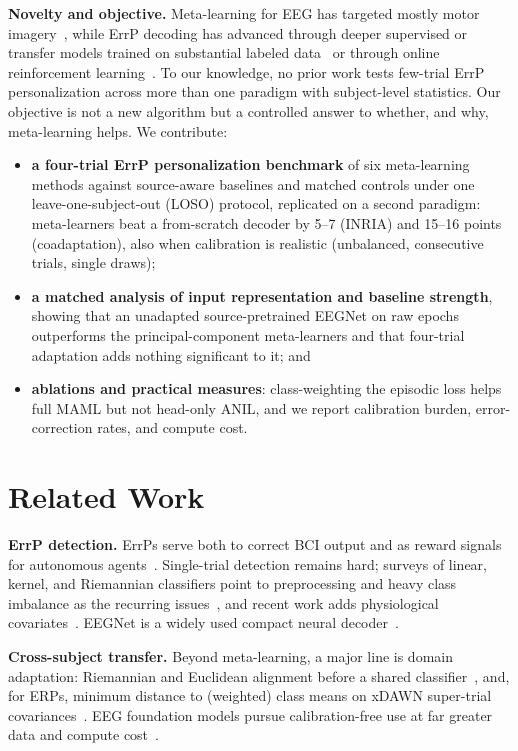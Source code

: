 \documentclass[conference,a4paper]{IEEEtran}
\begin{document}
\textbf{Novelty and objective.} Meta-learning for EEG has targeted mostly motor
imagery~\cite{han2024metaeeg,wang2025tcpl,wei2024harnessing}, while ErrP decoding has
advanced through deeper supervised or transfer models trained on substantial labeled data~\cite{ren2024deep,yasemin2023single} or through online reinforcement
learning~\cite{fidencio2025hybrid}. To our knowledge, no prior work tests few-trial
ErrP personalization across more than one paradigm with subject-level statistics.
Our objective is not a new algorithm but a controlled answer to whether, and why, meta-learning helps. We contribute:
\begin{itemize}
\item \textbf{a four-trial ErrP personalization benchmark} of six meta-learning
methods against source-aware baselines and matched controls under one
leave-one-subject-out (LOSO) protocol, replicated on a second paradigm: meta-learners
beat a from-scratch decoder by 5--7 (INRIA) and 15--16 points (coadaptation), also
when calibration is realistic (unbalanced, consecutive trials, single draws);
\item \textbf{a matched analysis of input representation and baseline strength},
showing that an unadapted source-pretrained EEGNet on raw epochs outperforms the
principal-component meta-learners and that four-trial adaptation adds nothing
significant to it; and
\item \textbf{ablations and practical measures}: class-weighting the episodic loss
helps full MAML but not head-only ANIL, and we report calibration burden,
error-correction rates, and compute cost.
\end{itemize}

\section{Related Work}
\textbf{ErrP detection.} ErrPs serve both to correct BCI output and as reward signals
for autonomous agents~\cite{chavarriaga2010learning,iturrate2015teaching}. Single-trial
detection remains hard; surveys of linear, kernel, and Riemannian classifiers point to
preprocessing and heavy class imbalance as the recurring issues~\cite{yasemin2023single},
and recent work adds physiological covariates~\cite{park2025improving}. EEGNet is a widely used compact neural decoder~\cite{lawhern2018eegnet}.

\textbf{Cross-subject transfer.} Beyond meta-learning, a major line is domain adaptation: Riemannian and Euclidean alignment before a shared
classifier~\cite{zanini2018transfer,wu2025revisiting}, and, for ERPs, minimum distance
to (weighted) class means on xDAWN super-trial
covariances~\cite{barachant2014plugplay,khazem2021minimizing}. EEG foundation models
pursue calibration-free use at far greater data and compute
cost~\cite{kuruppu2025foundation}.
\end{document}
